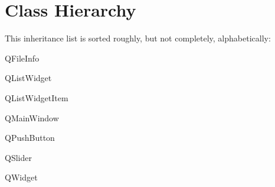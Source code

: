 \section{Class Hierarchy}
This inheritance list is sorted roughly, but not completely, alphabetically\+:\begin{DoxyCompactList}
\item Q\+File\+Info\begin{DoxyCompactList}
\item {}
\end{DoxyCompactList}
\item Q\+List\+Widget\begin{DoxyCompactList}
\item {}
\end{DoxyCompactList}
\item Q\+List\+Widget\+Item\begin{DoxyCompactList}
\item {}
\end{DoxyCompactList}
\item Q\+Main\+Window\begin{DoxyCompactList}
\item {}
\end{DoxyCompactList}
\item Q\+Push\+Button\begin{DoxyCompactList}
\item {}
\end{DoxyCompactList}
\item Q\+Slider\begin{DoxyCompactList}
\item {}
\end{DoxyCompactList}
\item Q\+Widget\begin{DoxyCompactList}
\item {}
\end{DoxyCompactList}
\end{DoxyCompactList}
